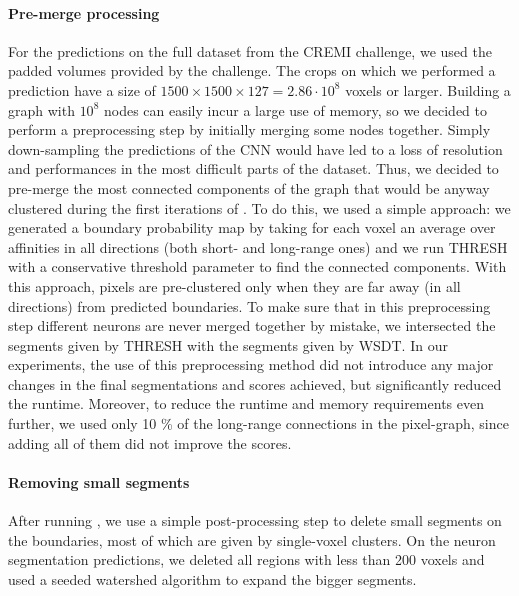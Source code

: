  \paragraph{Pre-merge processing} For the predictions on the full dataset from the CREMI challenge, we used  the padded volumes provided by the challenge. The crops on which we performed a prediction have a size of $1500\times1500\times127=2.86\cdot 10^8$ voxels or larger. Building a graph with $10^8$ nodes can easily incur a large use of memory, so we decided to perform a preprocessing step by initially merging some nodes together. Simply down-sampling the predictions of the CNN would have led to a loss of resolution and performances in the most difficult parts of the dataset. Thus, we decided to pre-merge the most connected components of the graph that would be anyway clustered during the first iterations of \algname{}. To do this, we used a simple approach: we generated a boundary probability map by taking for each voxel an average over affinities in all directions (both short- and long-range ones) and we run THRESH with a conservative threshold parameter to find the connected components. With this approach, pixels are pre-clustered only when they are far away (in all directions) from predicted boundaries. 
 To make sure that in this preprocessing step different neurons are never merged together by mistake, we intersected the segments given by THRESH with the segments given by WSDT. 
 In our experiments, the use of this preprocessing method did not introduce any major changes in the final segmentations and scores achieved, but significantly reduced the runtime. Moreover, to reduce the runtime and memory requirements even further, we used only 10 \% of the long-range connections in the pixel-graph, since adding all of them did not improve the scores. 
 
 \paragraph{Removing small segments} After running \algname{}, we use a simple post-processing step to delete small segments on the boundaries, most of which are given by single-voxel clusters. On the neuron segmentation predictions, we deleted all regions with less than 200 voxels and used a seeded watershed algorithm to expand the bigger segments.

